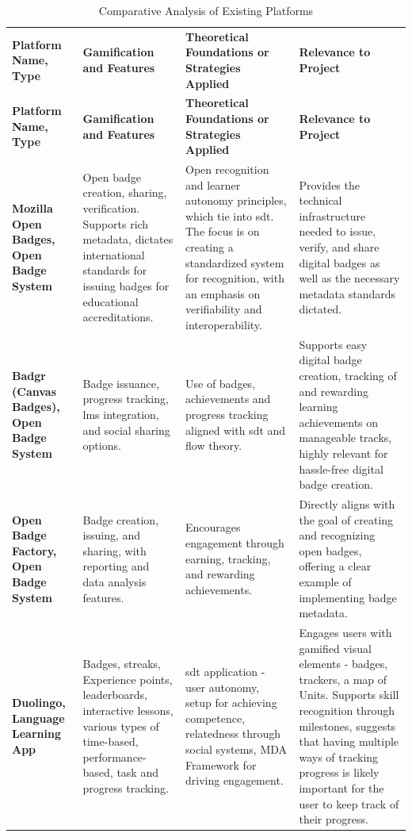 \begin{longtable}[c]{|p{2.5cm}|p{4cm}|p{4cm}|p{4cm}|}
\captionsetup{justification=raggedright, singlelinecheck=false}
\caption{Comparative Analysis of Existing Platforms} \\
\hline
\textbf{Platform Name, Type} & \textbf{Gamification and Features} & \textbf{Theoretical Foundations or Strategies Applied} & \textbf{Relevance to Project} \\
\hline
\endfirsthead
\hline
\textbf{Platform Name, Type} & \textbf{Gamification and Features} & \textbf{Theoretical Foundations or Strategies Applied} & \textbf{Relevance to Project} \\
\hline
\endhead
\hline
\endfoot
\hline
\endlastfoot

\textbf{Mozilla Open Badges, Open Badge System} & Open badge creation, sharing, verification. Supports rich metadata, dictates international standards for issuing badges for educational accreditations. & Open recognition and learner autonomy principles, which tie into \acrshort{sdt}. The focus is on creating a standardized system for recognition, with an emphasis on verifiability and interoperability. & Provides the technical infrastructure needed to issue, verify, and share digital badges as well as the necessary metadata standards dictated. \\
\hline
\textbf{Badgr (Canvas Badges), Open Badge System} & Badge issuance, progress tracking, \acrshort{lms} integration, and social sharing options. & Use of badges, achievements and progress tracking aligned with \acrshort{sdt} and flow theory. & Supports easy digital badge creation, tracking of and rewarding learning achievements on manageable tracks, highly relevant for hassle-free digital badge creation. \\
\hline
\textbf{Open Badge Factory, Open Badge System} & Badge creation, issuing, and sharing, with reporting and data analysis features. & Encourages engagement through earning, tracking, and rewarding achievements. & Directly aligns with the goal of creating and recognizing open badges, offering a clear example of implementing badge metadata. \\
\hline
\textbf{Duolingo, Language Learning App} & Badges, streaks, Experience points, leaderboards, interactive lessons, various types of time-based, performance-based, task and progress tracking. & \acrshort{sdt} application - user autonomy, setup for achieving competence, relatedness through social systems, MDA Framework for driving engagement. & Engages users with gamified visual elements - badges, trackers, a map of Units. Supports skill recognition through milestones, suggests that having multiple ways of tracking progress is likely important for the user to keep track of their progress. \\

\end{longtable}
